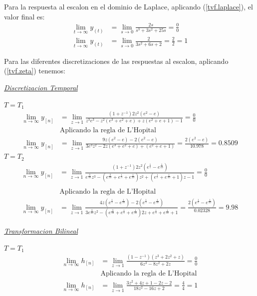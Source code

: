 \documentclass[a4paper,12pt]{report}
\begin{document}
\begin{enumerate}[label=\alph*), left=0pt]
                Para la respuesta al escalon en el dominio de Laplace, aplicando (\ref{tvf.laplace}), el valor final es:
                \begin{align*}
                    \lim_{t \to \infty} y_{(t)} &= \lim_{s \to 0} \frac{2s}{s^3 + 3s^2 + 25s} = \frac{0}{0}\\
                    \lim_{t \to \infty} y_{(t)} &= \lim_{s \to 0} \frac{2}{3s^2 + 6s + 2} = \frac{2}{2} = 1
                \end{align*}

                Para las diferentes discretizaciones de las respuestas al escalon, aplicando (\ref{tvf.zeta}) tenemos:

                {\centering\underline{\textit{Discretizacion Temporal}}\par}
                $T = T_1$
                \begin{align*}
                    \lim_{n \to \infty} y_{[n]} &= \lim_{z \to 1} \frac{(1 + z^{-1}) 2z^2 (e^2 - e)}{z^3 e^3 - z^2(e^3+e^2+e)+z(e^2+e+1)-1} = \frac{0}{0}\\
                      &\text{Aplicando la regla de L'Hopital}\\
                    \lim_{n \to \infty} y_{[n]} &= \lim_{z \to 1} \frac{9z(e^2-e) - 2(e^2-e)}{3e^3z^2-2z(e^3+e^2+e)+(e^2+e+1)} = \frac{2(e^2-e)}{10.978} = 0.8509
                \end{align*}
                $T = T_2$
                \begin{align*}
                    \lim_{n \to \infty} y_{[n]} &= \lim_{z \to 1} \frac{(1 + z^{-1}) 2 z^2 (e^{\frac{1}{5}} - e^{\frac{1}{10}})}{e^{\frac{3}{10}}z^3 - (e^{\frac{3}{10}} + e^{\frac{1}{5}} + e^{\frac{1}{10}})z^2
                        + (e^{\frac{1}{5}} + e^{\frac{1}{10}} + 1)z - 1} = \frac{0}{0}\\\\
                      &\text{Aplicando la regla de L'Hopital}\\
                    \lim_{n \to \infty} y_{[n]} &= \lim_{z \to 1} \frac{4z (e^{\frac{1}{5}} - e^{\frac{1}{10}}) - 2(e^{\frac{1}{5}} - e^{\frac{1}{10}})}{3e^{\frac{3}{10}}z^2 - (e^{\frac{3}{10}} + e^{\frac{1}{5}} + e^{\frac{1}{10}})2z + e^{\frac{1}{5}} + e^{\frac{1}{10}} + 1} = \frac{2(e^{\frac{1}{5}} - e^{\frac{1}{10}})}{0.02328} = 9.98
                \end{align*}

                {\centering\underline{\textit{Transformacion Bilineal}}\par}
                $T = T_1$
                \begin{align*}
                    \lim_{n \to \infty} h_{[n]} &= \lim_{z\to{1}} \frac{(1-z^{-1})(z^3+2z^2+z)}{6z^3-8z^2+2z} = \frac{0}{0}\\
                      &\text{Aplicando la regla de L'Hopital}\\
                    \lim_{n \to \infty} h_{[n]} &= \lim_{z\to{1}} \frac{3z^2+4z+1-2z-2}{18z^2-16z+2} = \frac{4}{4} = 1
                \end{align*}


\end{enumerate}
\end{document}
